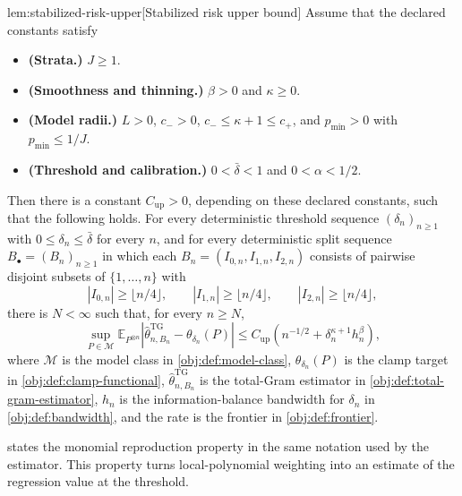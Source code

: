 \begin{lemmav}{lem:stabilized-risk-upper}[Stabilized risk upper bound]
Assume that the declared constants satisfy
\begin{itemize}
\item \textbf{(Strata.)} \(J\geq 1\).
\item \textbf{(Smoothness and thinning.)} \(\beta>0\) and \(\kappa\geq 0\).
\item \textbf{(Model radii.)} \(L>0\), \(c_->0\), \(c_-\leq \kappa+1\leq c_+\), and \(p_{\min}>0\) with \(p_{\min}\leq 1/J\).
\item \textbf{(Threshold and calibration.)} \(0<\bar\delta<1\) and \(0<\alpha<1/2\).
\end{itemize}
Then there is a constant \(C_{\mathrm{up}}>0\), depending on these declared constants, such that the following holds.  For every deterministic threshold sequence \((\delta_n)_{n\geq 1}\) with \(0\leq \delta_n\leq \bar\delta\) for every \(n\), and for every deterministic split sequence \(B_{\bullet}=(B_n)_{n\geq 1}\) in which each \(B_n=(I_{0,n},I_{1,n},I_{2,n})\) consists of pairwise disjoint subsets of \(\{1,\ldots,n\}\) with
\[
|I_{0,n}|\geq \lfloor n/4\rfloor,\qquad
|I_{1,n}|\geq \lfloor n/4\rfloor,\qquad
|I_{2,n}|\geq \lfloor n/4\rfloor,
\]
there is \(N<\infty\) such that, for every \(n\geq N\),
\[
\sup_{P\in\mathcal M}
\mathbb E_{P^{\otimes n}}
\left|\widehat\theta^{\mathrm{TG}}_{n,B_n}-\theta_{\delta_n}(P)\right|
\leq
C_{\mathrm{up}}\left(n^{-1/2}+\delta_n^{\kappa+1}h_n^\beta\right),
\]
where \(\mathcal M\) is the model class in \cref{obj:def:model-class}, \(\theta_{\delta_n}(P)\) is the clamp target in \cref{obj:def:clamp-functional}, \(\widehat\theta^{\mathrm{TG}}_{n,B_n}\) is the total-Gram estimator in \cref{obj:def:total-gram-estimator}, \(h_n\) is the information-balance bandwidth for \(\delta_n\) in \cref{obj:def:bandwidth}, and the rate is the frontier in \cref{obj:def:frontier}.
\end{lemmav}

 states the monomial reproduction property in the same notation used by the estimator. This property turns local-polynomial weighting into an estimate of the regression value at the threshold.

